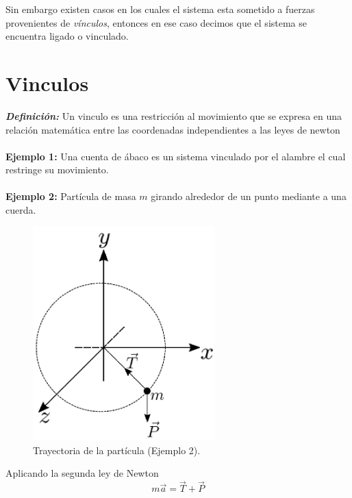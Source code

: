 \documentclass[12pt]{report}
\begin{document}
Sin embargo existen casos en los cuales el sistema esta sometido a fuerzas provenientes de \textit{vínculos}, entonces en ese caso decimos que el sistema se encuentra ligado o vinculado.









\section{Vinculos}


\textbf{\textit{Definición:}} Un vinculo es una restricción al movimiento que se expresa en una relación matemática entre las coordenadas independientes a las leyes de newton \\
\\


\textbf{Ejemplo 1:} Una cuenta de ábaco es un sistema vinculado por el alambre el cual restringe su movimiento. \\
\\

\textbf{Ejemplo 2:} Partícula de masa $m$ girando alrededor de un punto mediante a una cuerda. 

\begin{figure}[h]
	\begin{center}
	\includegraphics[width=7cm]{figura20.png} 
	\caption{ Trayectoria de la partícula (Ejemplo 2).}
	\label{fig.1}
	\end{center}
\end{figure}


Aplicando la segunda ley de Newton 
\begin{equation}
m\vec{a}=\vec{T}+\vec{P}
\end{equation}
\end{document}
